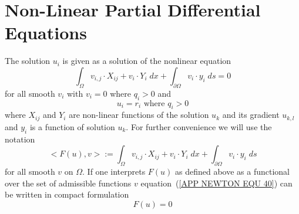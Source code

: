 
%
%
%

\chapter{Non-Linear Partial Differential Equations}
\label{APP: NEWTON}

The solution $u_i$ is given as a solution of
the nonlinear equation
\begin{equation} \label{APP NEWTON EQU 40}
\int_{\Omega} v_{i,j} \cdot X_{ij} + v_{i} \cdot Y_{i} \; dx
+ \int_{\partial \Omega}  v_{i} \cdot y_{i} \; ds  = 0 
\end{equation}
for all smooth $v_i$ with $v_i=0$ where $q_i>0$ and
\begin{equation} \label{APP NEWTON EQU 40b}
u_i=r_i \mbox{ where } q_i>0
\end{equation}
where $X_{ij}$ and $Y_i$ are non-linear functions of the solution $u_k$ and its gradient $u_{k,l}$
and $y_i$ is a function of solution $u_k$. For further convenience we will use the 
notation  
\begin{equation} \label{APP NEWTON EQU 40c}
<F(u),v> :=\int_{\Omega} v_{i,j} \cdot X_{ij} + v_{i} \cdot Y_{i} \; dx
+ \int_{\partial \Omega}  v_{i} \cdot y_{i} \; ds
\end{equation}
for all smooth $v$ on $\Omega$. If one interprets $F(u)$ as defined above as a functional 
over the set of admissible functions $v$  
equation~(\ref{APP NEWTON EQU 40}) can be written in compact formulation
\begin{equation} \label{APP NEWTON EQU 40d}
F(u)= 0 
\end{equation}

